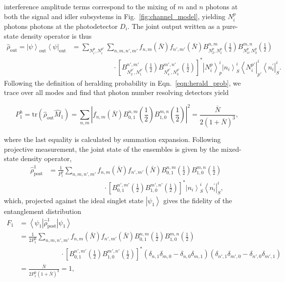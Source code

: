\documentclass[aps,twocolumn,secnumarabic,amsmath,amssymb,pra,groupedaddress,
showpacs, showkeys]{revtex4-1}
\newcommand{\bra}[1]{\left\langle #1 \right|}
\newcommand{\ket}[1]{\left|#1\right\rangle}
\newcommand{\pna}[1]{\left(#1\right)}
\newcommand{\pnb}[1]{\left[#1\right]}
\newcommand{\eqn}[1]{
\begin{equation}
	#1
\end{equation}
}
\newcommand{\abs}[1]{\left|#1\right|}
\begin{document}
interference amplitude terms correspond to the mixing of $m$ and $n$ photons at
both the signal and idler subsystems in Fig.~\ref{fig:channel_model}, yielding
$N^p_i$ photons photons at the photodetector $D_i$. The joint output written as
a pure-state density operator is thus
\begin{align}
\hat{\rho}_{\textrm{out}} =\ket{\psi}_{\textrm{out}} \bra{\psi}_{\textrm{out}} & =\sum_{N_i^p, N_i^{p\prime}}\sum_{n,m,n',m'} f_{n,m}\pna{\bar{N}}f_{n',m'}\pna{\bar{N}} B_{N_2^p,N_1^p}^{n,m}\pna{\frac{1}{2}}  
B_{N_4^p,N_3^p}^{m,n}\pna{\frac{1}{2}} \nonumber \\
& \qquad\qquad\qquad\cdot  \pnb{B_{N_2^{p\prime},N_1^{p\prime}}^{n',m'}\pna{\frac{1}{2}}  
B_{N_4^{p\prime},N_3^{p\prime}}^{m',n'}\pna{\frac{1}{2}}}^*\ket{N_i^{p}}^i_p\ket{n_i}^i_S\bra{N_i^{p\prime}}^i_{p\prime}\bra{n_i^{\prime}}^i_S .\label{eqn:joint_state_lossless}
\end{align}
Following the definition of heralding probability in
Eqn.~\ref{eqn:herald_prob}, we trace over all modes and find that photon number
resolving detectors yield
\eqn{
	P_{1}^{h}=\textrm{tr}\pna{\hat{\rho}_{\textrm{out}} \hat{M}_{1}} = \sum_{n,m} \abs{f_{n,m}\pna{\bar{N}} 
		B_{0,1}^{n,m}\pna{\frac{1}{2}} B_{1,0}^{m,n}\pna{\frac{1}{2}}}^2 =\frac{\bar{N}}{2\pna{1+\bar{N}}^3},\label{eq:chap3:lossless_prob}
}
where the last equality is calculated by summation expansion. Following
projective measurement, the joint state of the ensembles is given by the
mixed-state density operator,
\begin{align}
\hat{\rho}_{\textrm{post}}^{1} & = \frac{1}{P_{1}^{h}}\sum_{n,m,n',m'} f_{n,m}\pna{\bar{N}}f_{n',m'}\pna{\bar{N}} B_{0,1}^{n,m}\pna{\frac{1}{2}}  
B_{1,0}^{m,n}\pna{\frac{1}{2}} \nonumber \\
& \qquad\qquad\qquad\qquad \cdot \pnb{B_{0,1}^{n',m'}\pna{\frac{1}{2}}  
B_{1,0}^{m',n'}\pna{\frac{1}{2}}}^*\ket{n_i}^i_S\bra{n_i^{\prime}}^i_S,\label{eqn:post:lossless}
\end{align}
which, projected against the ideal singlet state $\ket{\psi_{1}}$ gives the
fidelity of the entanglement distribution
\begin{align}
	F_{1}&=\bra{\psi_{1}}\hat{\rho}_{\textrm{post}}^{1} \ket{\psi_{1}} \nonumber \\
		& = \frac{1}{2P_{1}^{h}}\sum_{n,m,n',m'} f_{n,m}\pna{\bar{N}}f_{n',m'}\pna{\bar{N}} B_{0,1}^{n,m}\pna{\frac{1}{2}}  
		B_{1,0}^{m,n}\pna{\frac{1}{2}}\nonumber \\ 
		& \qquad \qquad \qquad \cdot \pnb{B_{0,1}^{n',m'}\pna{\frac{1}{2}} B_{1,0}^{m',n'}\pna{\frac{1}{2}}}^*\pna{\delta_{n,1}\delta_{m,0}-\delta_{n,0}\delta_{m,1}}\pna{\delta_{n',1}\delta_{m',0}-\delta_{n',0}\delta_{m',1}} \nonumber \\
		& = \frac{\bar{N}}{2P_{1}^{h}\pna{1+\bar{N}}^3}=1,
\end{align}
\end{document}
